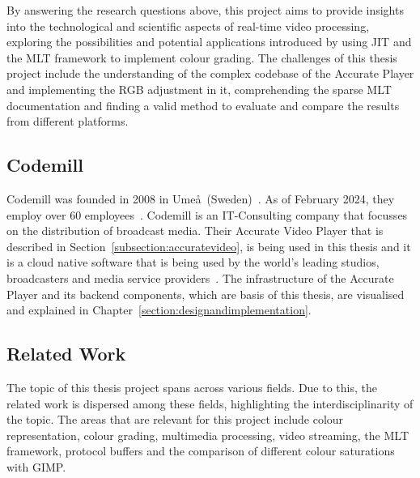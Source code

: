 \documentclass[../MasterThesis.tex]{subfiles}
\begin{document}
	
	By answering the research questions above, this project aims to provide insights into the technological and scientific aspects of real-time video processing, exploring the possibilities and potential applications introduced by using JIT and the MLT framework to implement colour grading. 
	The challenges of this thesis project include the understanding of the complex codebase of the Accurate Player and implementing the RGB adjustment in it, comprehending the sparse MLT documentation and finding a valid method to evaluate and compare the results from different platforms.
	
	

	
	
	
	
\newpage	
	\subsection{Codemill} \label{subsection:codemill}
	
	Codemill was founded in 2008 in Ume\aa \ (Sweden)~\cite{codemill_now, codemill_old}.
	As of February 2024, they employ over 60 employees~\cite{codemill}. 
	Codemill is an IT-Consulting company that focusses on the distribution of broadcast media. Their Accurate Video Player that is described in Section~\ref{subsection:accuratevideo}, is being used in this thesis and it is a cloud native software that is being used by the world's leading studios, broadcasters and media service providers~\cite{codemill_linkedin, codemill_avp}.
	The infrastructure of the Accurate Player and its backend components, which are basis of this thesis, are visualised and explained in Chapter~\ref{section:designandimplementation}.
	
	
	
	
	
	
	
	
	
	
	
	
	\subsection{Related Work} \label{subsection:relatedwork}
	
	The topic of this thesis project spans across various fields. 
	Due to this, the related work is dispersed among these fields, highlighting the interdisciplinarity of the topic.
	The areas that are relevant for this project include colour representation, colour grading, multimedia processing, video streaming, the MLT framework, protocol buffers and the comparison of different colour saturations with GIMP.
\end{document}
